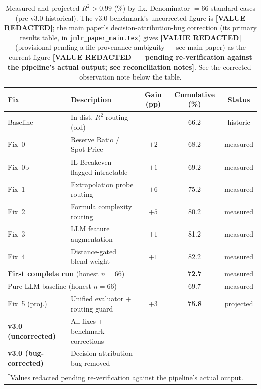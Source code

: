 \documentclass[twoside,11pt]{article}
\begin{document}
\begin{table}[h]
\centering
\caption{Measured and projected $R^2 > 0.99$ (\%) by fix.
         Denominator $= 66$ standard cases (pre-v3.0 historical). The
         v3.0 benchmark's uncorrected figure is \textbf{[VALUE REDACTED]}; the
         main paper's decision-attribution-bug correction
         (its primary results table, in \texttt{jmlr\_paper\_main.tex})
         gives \textbf{[VALUE REDACTED]} (provisional pending a
         file-provenance ambiguity --- see main paper) as the current
         figure \textbf{[VALUE REDACTED --- pending re-verification against the pipeline's actual output; see reconciliation notes]}. See the
         corrected-observation note below the table.}
\label{tab:projected}
\begin{tabular}{llccc}
\toprule
\textbf{Fix} & \textbf{Description} & \textbf{Gain (pp)} & \textbf{Cumulative (\%)} & \textbf{Status} \\
\midrule
Baseline    & In-dist. $R^2$ routing (old)      & ---  & 66.2 & historic  \\
Fix~0       & Reserve Ratio / Spot Price        & $+2$ & 68.2 & measured  \\
Fix~0b      & IL Breakeven flagged intractable  & $+1$ & 69.2 & measured  \\
Fix~1       & Extrapolation probe routing       & $+6$ & 75.2 & measured  \\
Fix~2       & Formula complexity routing        & $+5$ & 80.2 & measured  \\
Fix~3       & LLM feature augmentation          & $+1$ & 81.2 & measured  \\
Fix~4       & Distance-gated blend weight       & $+1$ & 82.2 & measured  \\
\midrule
\multicolumn{2}{l}{\textbf{First complete run} (honest $n{=}66$)} & & \textbf{72.7} & measured \\
\multicolumn{2}{l}{Pure LLM baseline (honest $n{=}66$)}           & & 69.7          & measured \\
\midrule
Fix~5 (proj.) & Unified evaluator + routing guard & $+3$ & \textbf{75.8} & projected \\
\midrule
\textbf{v3.0 (uncorrected)} & All fixes + benchmark corrections & --- & --- & --- \\
\textbf{v3.0 (bug-corrected)} & Decision-attribution bug removed & --- & --- & --- \\
\bottomrule
\multicolumn{5}{l}{\footnotesize\textsuperscript{$\ddagger$}Values redacted pending re-verification against the pipeline's actual output.}\\
\end{tabular}
\end{table}
\end{document}
